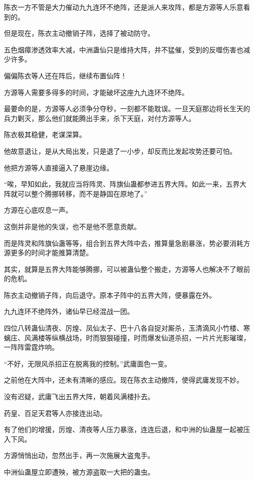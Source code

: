 \begin{this_body}
陈衣一方不管是大力催动九九连环不绝阵，还是派人来攻阵，都是方源等人乐意看到的。

但是现在，陈衣主动撤销子阵，选择了被动防守。

五色烟瘴渗透效率大减，中洲蛊仙只是维持大阵，并不猛催，受到的反噬伤害也减少许多。

偏偏陈衣等人还在阵后，继续布置仙阵！

方源等人需要多得多的时间，才能破坏这座九九连环不绝阵。

最要命的是，方源等人必须争分夺秒，一刻都不能耽误。一旦天庭那边将长生天的兵力剿灭，那么他们就能腾出手来，杀下天庭，对付方源等人。

陈衣极其稳健，老谋深算。

他故意退让，是从大局出发，只是退了一小步，却反而比发起攻势还要可怕。

他把方源等人直接逼入了悬崖边缘。

“唉，早知如此，我就应当将阵灵、阵旗仙蛊都参进五界大阵。如此一来，五界大阵就可以整个腾挪转移，而不是静固在原地了。”

方源在心底叹息一声。

这倒并非是他的失误，也不是他不愿意贡献。

而是阵灵和阵旗仙蛊等等，组合到五界大阵中去，推算量急剧暴涨，势必要消耗方源更多的时间才能推算清楚。

其实，就算是五界大阵能够腾挪，可以被蛊仙整个搬走，方源等人也解决不了眼前的危机。

陈衣主动撤销子阵，向后退守。原本子阵中的五界大阵，便暴露在外。

九九连环不绝阵外，诸仙早已经混战一团。

四位八转蛊仙清夜、厉煌、凤仙太子、巴十八各自捉对厮杀，玉清滴风小竹楼、寒螭庄、风满楼等纵横战场，时而狠狠碰撞，时而爆发仙道杀招，一片片光影璀璨，一阵阵雷霆炸响。

“不好，无限风杀招正在脱离我的控制。”武庸面色一变。

之前他在大阵中，还未有清晰的感应。现在陈衣主动撤阵，使得武庸发现不妙。

没有迟疑，武庸飞出五界大阵，朝着风满楼扑去。

药皇、百足天君等人亦接连出动。

有了他们的增援，厉煌、清夜等人压力暴涨，连连后退，和中洲的仙蛊屋一起被压入下风。

方源悄悄出动，忽然出手，再一次施展大盗鬼手。

中洲仙蛊屋立即遭殃，被方源盗取一大把的蛊虫。


\end{this_body}
